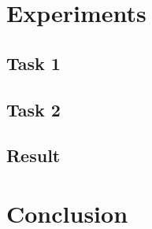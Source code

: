 \documentclass{article}
\begin{document}
\section{Experiments}

\subsection{Task 1}

\subsection{Task 2}

\subsection{Result}

\section{Conclusion}
\end{document}
